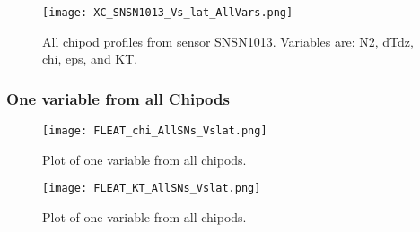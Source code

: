 \documentclass[11pt]{article}
\begin{document}
\begin{figure}[htbp] 
\texttt{[image: XC\_SNSN1013\_Vs\_lat\_AllVars.png]} 
\caption{All chipod profiles from sensor SNSN1013. Variables are: N2, dTdz, chi, eps, and KT.} 
\label{} 
\end{figure} 

\clearpage 
\newpage 
\subsubsection{One variable from all Chipods} 

\begin{figure}[htbp] 
\texttt{[image: FLEAT\_chi\_AllSNs\_Vslat.png]} 
\caption{Plot of one variable from all chipods.} 
\label{} 
\end{figure} 

\begin{figure}[htbp] 
\texttt{[image: FLEAT\_KT\_AllSNs\_Vslat.png]} 
\caption{Plot of one variable from all chipods.} 
\label{} 
\end{figure} 
\end{document}
